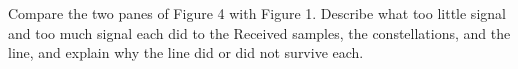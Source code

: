 \documentclass{exam}
\begin{document}
\begin{Form}
\begin{questions}
\newpage
\question Compare the two panes of Figure 4 with Figure 1. Describe what too little signal and
too much signal each did to the Received samples, the constellations, and the line, and explain
why the line did or did not survive each.
	\begin{solution}[3.0in]\end{solution}

\end{questions}

\docstatement

\end{Form}
\end{document}
